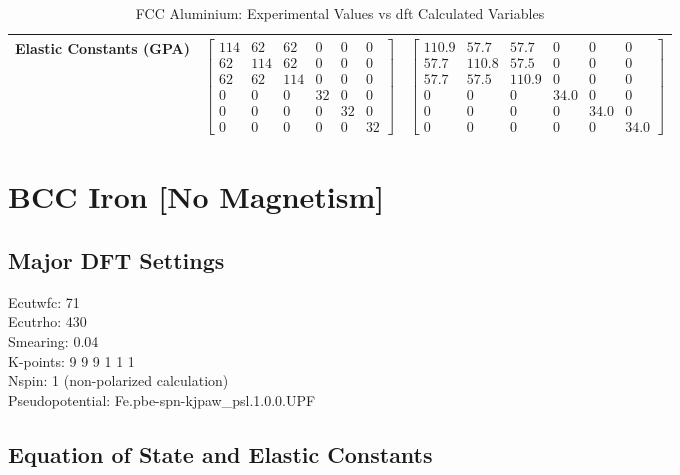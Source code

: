 \begin{table}[ht]
\begin{tabular}{lll}
Elastic Constants (GPA)      & $\begin{bmatrix} 114 & 62 & 62 & 0 & 0 & 0 \\ 62 & 114 & 62 & 0 & 0 & 0 \\ 62 & 62 & 114 & 0 & 0 & 0 \\ 0 & 0 & 0 & 32 & 0 & 0 \\ 0 & 0 & 0 & 0 & 32 & 0 \\ 0 & 0 & 0 & 0 & 0 & 32 \end{bmatrix}$ & $\begin{bmatrix} 110.9 & 57.7 & 57.7 & 0 & 0 & 0 \\ 57.7 & 110.8 & 57.5 & 0 & 0 & 0 \\ 57.7 & 57.5 & 110.9 & 0 & 0 & 0 \\ 0 & 0 & 0 & 34.0 & 0 & 0 \\ 0 & 0 & 0 & 0 & 34.0 & 0 \\ 0 & 0 & 0 & 0 & 0 & 34.0 \end{bmatrix}$ \\
\hline\hline
\end{tabular}
\caption{FCC Aluminium: Experimental Values vs \acrshort{dft} Calculated Variables}
\label{table:alfccexperimentaldft}
\end{table}




\clearpage
\FloatBarrier
\section{BCC Iron [No Magnetism]}

\FloatBarrier
\subsection{Major DFT Settings}

Ecutwfc: 71 \\
Ecutrho: 430 \\ 
Smearing: 0.04 \\
K-points: 9 9 9 1 1 1 \\
Nspin: 1  (non-polarized calculation) \\
Pseudopotential: Fe.pbe-spn-kjpaw\_psl.1.0.0.UPF \\


\FloatBarrier
\subsection{Equation of State and Elastic Constants}

